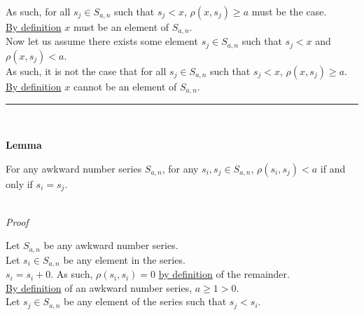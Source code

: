 \documentclass[a4paper,12pt]{article}
\begin{document}
\noindent As such, for all $s_j \in S_{a, n}$ such that $s_j < x$, $\rho(x, s_j) \geq a$ must be the case.\\

\noindent \hyperlink{definition:awkward_number_series}{By definition} $x$ must be an element of $S_{a, n}$.\\

\noindent Now let us assume there exists some element $s_j \in S_{a, n}$ such that $s_j < x$ and $\rho(x, s_j) < a$.\\

\noindent As such, it is not the case that for all $s_j \in S_{a, n}$ such that $s_j < x$, $\rho(x, s_j) \geq a$.\\

\noindent \hyperlink{definition:awkward_number_series}{By definition} $x$ cannot be an element of $S_{a, n}$.


\begin{center}
\noindent\rule{8cm}{0.4pt}
\end{center}
\noindent \\









\label{lemma:non_divisibility_of_elements}
\hypertarget{lemma:non_divisibility_of_elements}{}
\begin{tcolorbox}
\textbf{Lemma}

For any awkward number series $S_{a, n}$, for any $s_i, s_j \in S_{a, n}$, $\rho(s_i, s_j) < a$ if and only if $s_i = s_j$.
\end{tcolorbox}

\noindent \\
\textit{Proof}

\noindent Let $S_{a, n}$ be any awkward number series.\\

\noindent Let $s_i \in S_{a, n}$ be any element in the series.\\

\noindent $s_i = s_i + 0$. As such, $\rho(s_i, s_i) = 0$ \hyperlink{theorem:remainder_theorem}{by definition} of the remainder.\\

\noindent \hyperlink{definition:awkward_number_series}{By definition} of an awkward number series, $a \geq 1 > 0$.\\

\noindent Let $s_j \in S_{a, n}$ be any element of the series such that $s_j < s_i$.\\
\end{document}

